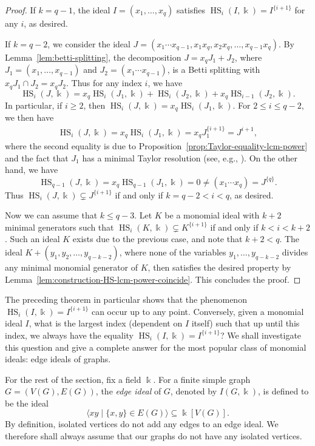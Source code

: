 \documentclass[reqno]{amsart}
\DeclareMathOperator{\HS}{HS}
\theoremstyle{definition}
\theoremstyle{remark}
\numberwithin{equation}{section}
\begin{document}
\begin{proof}
    If $k=q-1$, the ideal $I=(x_1,\dots, x_q)$ satisfies $\HS_i(I,\Bbbk)= I^{\{i+        1\}}$ for any $i$, as desired.

    If $k=q-2$, we consider the ideal $J=(x_1\cdots x_{q-1},x_1x_q,x_2x_q,\dots, x_{q-1}x_q)$. By Lemma~\ref{lem:betti-splitting}, the decomposition $J=x_qJ_1+J_2$, where   $J_1=(x_1,\dots, x_{q-1})$ and $J_2=(x_1\cdots x_{q-1})$, is a Betti splitting with $x_qJ_1\cap J_2=x_qJ_2$. Thus for any index $i$, we have
    \[
    \HS_i(J,\Bbbk)=x_q\HS_i(J_1,\Bbbk)+\HS_{i}(J_2,\Bbbk)+x_q\HS_{i-1}(J_2,\Bbbk).
    \]
    In particular, if $i\geq 2$, then $\HS_i(J,\Bbbk)=x_q\HS_i(J_1,\Bbbk)$. For $2\leq i\leq q-2$, we then have
    \begin{align*}
        \HS_i(J,\Bbbk)= x_q\HS_{i}(J_1,\Bbbk)=x_qJ_1^{\{i+1\}} = J^{i+1},
    \end{align*}
    where the second equality is due to Proposition~\ref{prop:Taylor-equality-lcm-power} and the fact that $J_1$ has a minimal Taylor resolution (see, e.g., \cite[Corollary 4.9]{Alesandroni2017}).
    On the other hand, we have
    \[
    \HS_{q-1}(J,\Bbbk)=x_q\HS_{q-1}(J_1,\Bbbk)=0\neq (x_1\cdots x_q) = J^{\{q\} }.
    \]
    Thus $\HS_i(J,\Bbbk)\subsetneq J^{\{i+        1\}}$ if and only if $k=q-2<i<q$, as desired.

    Now we can assume that $k\leq q-3$. Let $K$ be a monomial ideal with $k+2$ minimal generators such that $\HS_i(K,\Bbbk)\subsetneq K^{\{i+        1\}}$ if and only if $k<i<k+2$. Such an ideal $K$ exists due to the previous case, and note that $k+2<q$. The ideal $K+(y_1,y_2,\dots, y_{q-k-2} )$, where none of the variables $y_1,\dots, y_{q-k-2}$ divides any minimal monomial generator of $K$, then satisfies the desired property by Lemma~\ref{lem:construction-HS-lcm-power-coincide}. This concludes the proof. 
\end{proof}

The preceding theorem in particular shows that the phenomenon $\HS_i(I,\Bbbk)=I^{ \{i+1\} }$ can occur up to any point. Conversely, given a monomial ideal $I$, what is the largest index (dependent on $I$ itself) such that up until this index, we always have the equality $\HS_i(I,\Bbbk)=I^{ \{i+1\} }$? We shall investigate this question and give a complete answer for the most popular class of monomial ideals: edge ideals of graphs.

For the rest of the section, fix a field $\Bbbk$. For a finite simple graph $G=(V(G),E(G))$, the \emph{edge ideal} of $G$, denoted by $I(G,\Bbbk)$, is defined to be the ideal
\[
\langle xy\mid \{x,y\}\in E(G) \rangle \subseteq \Bbbk[V(G)].
\]
By definition, isolated vertices do not add any edges to an edge ideal. We therefore shall always assume that our graphs do not have any isolated vertices.
\end{document}
